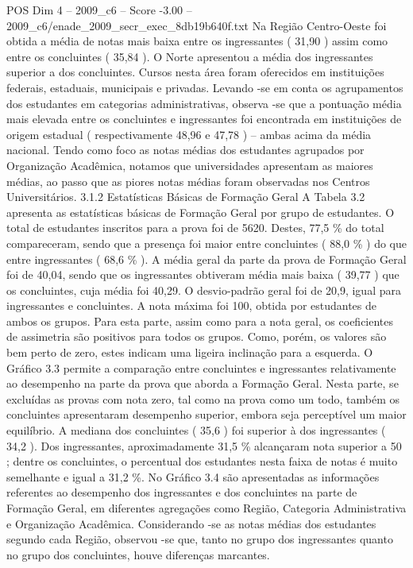 \begin{textsample}{POS Dim 4 – 2009\_c6 – Score -3.00 – 2009\_c6/enade\_2009\_secr\_exec\_8db19b640f.txt}
Na Região Centro-Oeste foi obtida a média de notas mais baixa entre os ingressantes ( 31,90 ) assim como entre os concluintes ( 35,84 ).
O Norte apresentou a média dos ingressantes superior a dos concluintes.
Cursos nesta área foram oferecidos em instituições federais, estaduais, municipais e privadas.
Levando -se em conta os agrupamentos dos estudantes em categorias administrativas, observa -se que a pontuação média mais elevada entre os concluintes e ingressantes foi encontrada em instituições de origem estadual ( respectivamente 48,96 e 47,78 ) – ambas acima da média nacional.
Tendo como foco as notas médias dos estudantes agrupados por Organização Acadêmica, notamos que universidades apresentam as maiores médias, ao passo que as piores notas médias foram observadas nos Centros Universitários. 3.1.2 Estatísticas Básicas de Formação Geral A Tabela 3.2 apresenta as estatísticas básicas de Formação Geral por grupo de estudantes.
O total de estudantes inscritos para a prova foi de 5620.
Destes, 77,5 \% do total compareceram, sendo que a presença foi maior entre concluintes ( 88,0 \% ) do que entre ingressantes ( 68,6 \% ).
A média geral da parte da prova de Formação Geral foi de 40,04, sendo que os ingressantes obtiveram média mais baixa ( 39,77 ) que os concluintes, cuja média foi 40,29.
O desvio-padrão geral foi de 20,9, igual para ingressantes e concluintes.
A nota máxima foi 100, obtida por estudantes de ambos os grupos.
Para esta parte, assim como para a nota geral, os coeficientes de assimetria são positivos para todos os grupos.
Como, porém, os valores são bem perto de zero, estes indicam uma ligeira inclinação para a esquerda.
O Gráfico 3.3 permite a comparação entre concluintes e ingressantes relativamente ao desempenho na parte da prova que aborda a Formação Geral.
Nesta parte, se excluídas as provas com nota zero, tal como na prova como um todo, também os concluintes apresentaram desempenho superior, embora seja perceptível um maior equilíbrio.
A mediana dos concluintes ( 35,6 ) foi superior à dos ingressantes ( 34,2 ).
Dos ingressantes, aproximadamente 31,5 \% alcançaram nota superior a 50 ; dentre os concluintes, o percentual dos estudantes nesta faixa de notas é muito semelhante e igual a 31,2 \%.
No Gráfico 3.4 são apresentadas as informações referentes ao desempenho dos ingressantes e dos concluintes na parte de Formação Geral, em diferentes agregações como Região, Categoria Administrativa e Organização Acadêmica.
Considerando -se as notas médias dos estudantes segundo cada Região, observou -se que, tanto no grupo dos ingressantes quanto no grupo dos concluintes, houve diferenças marcantes.

\end{textsample}
